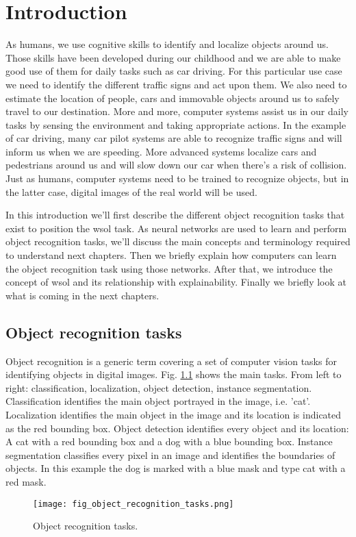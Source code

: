 \chapter{Introduction}

As humans, we use cognitive skills to identify and localize objects around us. Those skills have been developed during our childhood and we are able to make good use of them for daily tasks such as car driving. For this particular use case we need to identify the different traffic signs and act upon them. We also need to estimate the location of people, cars and immovable objects around us to safely travel to our destination. More and more, computer systems assist us in our daily tasks by sensing the environment and taking appropriate actions. In the example of car driving, many car pilot systems are able to recognize traffic signs and will inform us when we are speeding. More advanced systems localize cars and pedestrians around us and will slow down our car when there's a risk of collision. Just as humans, computer systems need to be trained to recognize objects, but in the latter case, digital images of the real world will be used.

In this introduction we'll first describe the different object recognition tasks that exist to position the \acrfull{wsol} task. As neural networks are used to learn and perform object recognition tasks, we'll discuss the main concepts and terminology required to understand next chapters. Then we briefly explain how computers can learn the object recognition task using those networks. After that, we introduce the concept of \acrlong{wsol} and its relationship with explainability. Finally we briefly look at what is coming in the next chapters.

\section{Object recognition tasks}
Object recognition is a generic term covering a set of computer vision tasks for identifying objects in digital images. Fig. \ref{fig:object_recognition_tasks} shows the main tasks. From left to right: classification, localization, object detection, instance segmentation. Classification identifies the main object portrayed in the image, i.e. 'cat'. Localization identifies the main object in the image and its location is indicated as the red bounding box. Object detection identifies every object and its location: A cat with a red bounding box and a dog with a blue bounding box. Instance segmentation classifies every pixel in an image and identifies the boundaries of objects. In this example the dog is marked with a blue mask and type cat with a red mask.
\begin{figure}[ht]
    \begin{center}
    \texttt{[image: fig\_object\_recognition\_tasks.png]}
    \caption{Object recognition tasks.}
    \label{fig:object_recognition_tasks}
    \end{center}
\end{figure}

